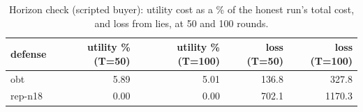 \begin{table}[t]
\centering
\small
\caption{Horizon check (scripted buyer): utility cost as a \% of the honest run's total cost, and loss from lies, at 50 and 100 rounds.}
\label{tab:horizon}
\begin{tabular}{lrrrr}
\toprule
defense & utility \% (T=50) & utility \% (T=100) & loss (T=50) & loss (T=100) \\
\midrule
obt & 5.89 & 5.01 & 136.8 & 327.8 \\
rep-n18 & 0.00 & 0.00 & 702.1 & 1170.3 \\
\bottomrule
\end{tabular}
\end{table}
